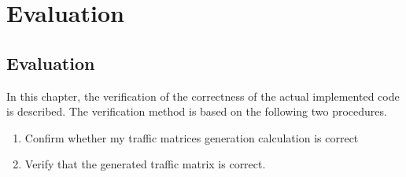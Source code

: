 \chapter{Evaluation}
\label{evaluation}

\section{Evaluation}
In this chapter, the verification of the correctness of the actual implemented code is described. 
The verification method is based on the following two procedures.

\begin{enumerate}
    \item Confirm whether my traffic matrices generation calculation is correct
    \item Verify that the generated traffic matrix is correct.
\end{enumerate}


